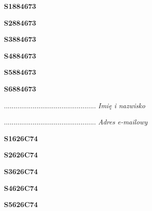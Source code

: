 \begin{turn}{90}\huge \textbf{S1884673}\end{turn}

\begin{turn}{90}\huge \textbf{S2884673}\end{turn}

\begin{turn}{90}\huge \textbf{S3884673}\end{turn}

\begin{turn}{90}\huge \textbf{S4884673}\end{turn}

\begin{turn}{90}\huge \textbf{S5884673}\end{turn}

\begin{turn}{90}\huge \textbf{S6884673}\end{turn}

\begin{turn}{90}\begin{minipage}{\linewidth} \vspace{20mm} ................................................  \textit{Imię i nazwisko}\end{minipage}\end{turn}

\begin{turn}{90}\begin{minipage}{\linewidth} \vspace{20mm} ................................................  \textit{Adres e-mailowy}\end{minipage}\end{turn}

\begin{turn}{90}\huge \textbf{S1626C74}\end{turn}

\begin{turn}{90}\huge \textbf{S2626C74}\end{turn}

\begin{turn}{90}\huge \textbf{S3626C74}\end{turn}

\begin{turn}{90}\huge \textbf{S4626C74}\end{turn}

\begin{turn}{90}\huge \textbf{S5626C74}\end{turn}


